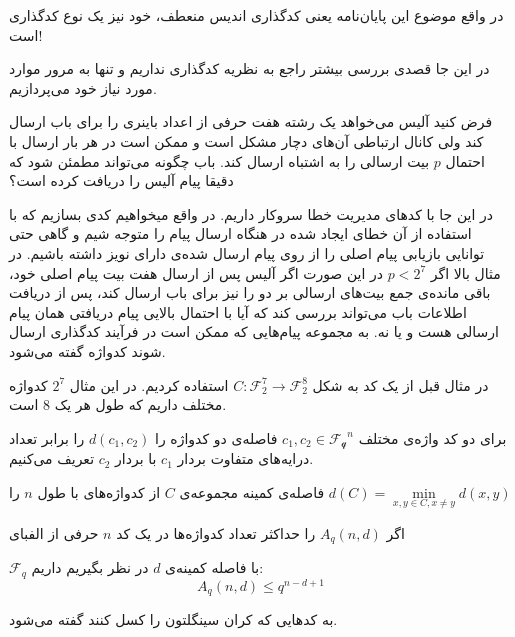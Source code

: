 در واقع موضوع این پایان‌نامه یعنی کدگذاری اندیس منعطف، خود نیز یک نوع کدگذاری است!

در این جا قصدی بررسی بیشتر راجع به نظریه کدگذاری نداریم و تنها به مرور موارد مورد نیاز خود می‌پردازیم.
\begin{example}
	فرض کنید آلیس می‌خواهد یک رشته هفت حرفی از اعداد باینری را برای باب ارسال کند ولی کانال ارتباطی آن‌های دچار مشکل است و ممکن است در هر بار ارسال با احتمال
	$p$
	بیت ارسالی را به اشتباه ارسال کند. باب چگونه می‌تواند مطمئن شود که دقیقا پیام آلیس را دریافت کرده است؟
	
	در این جا با کدهای مدیریت خطا سروکار داریم. در واقع میخواهیم کدی بسازیم که با استفاده از آن خطای ایجاد شده در هنگاه ارسال پیام را متوجه شیم و گاهی حتی توانایی بازیابی پیام اصلی را از روی پیام ارسال شده‌ی دارای نویز داشته باشیم. در مثال بالا اگر
	$p < 2^7$
	در این صورت اگر آلیس پس از ارسال هفت بیت پیام اصلی خود، باقی مانده‌ی جمع بیت‌های ارسالی بر دو را نیز برای باب ارسال کند، پس از دریافت اطلاعات باب می‌تواند بررسی کند که آیا با احتمال بالایی پیام دریافتی همان پیام ارسالی هست و یا نه. به مجموعه‌ پیام‌هایی که ممکن است در فرآیند کدگذاری ارسال شوند کدواژه گفته می‌شود.
	
	در مثال قبل از یک کد به شکل
	$C: \mathcal{F}_2^7 \rightarrow \mathcal{F}_2^8$
	استفاده کردیم. در این مثال
	$2^7$
	کدواژه مختلف داریم که طول هر یک
	$8$
	است.
\end{example}

\begin{definition}
	برای دو کد واژه‌ی مختلف
	$c_1, c_2 \in \mathcal{F_q}^n$
	فاصله‌ی دو کدواژه را
	$d(c_1, c_2)$
	را برابر تعداد درایه‌های متفاوت بردار
	$c_1$
	با بردار
	$c_2$
	تعریف می‌کنیم.
	
	 فاصله‌‌ی کمینه مجموعه‌ی
	$C$
	از کدواژه‌های با طول
	$n$
	 را
	$d(C) = \min\limits_{x, y \in C, x \ne y} d(x, y)$
\end{definition}

\begin{definition}
	اگر
	$A_q(n, d)$
	را حداکثر تعداد کدواژه‌ها در یک کد
	$n$
	حرفی از الفبای
	
	$\mathcal{F}_q$
	با فاصله کمینه‌ی 
	$d$
	در نظر بگیریم داریم:
	\begin{equation}
		A_q(n, d) \leq q^{n - d + 1}
	\end{equation}
	\cite{wiki:Singleton}
\end{definition}
\begin{definition}[
	کد
	\lr{mds}
	]
	\label{def:mds}
	به کدهایی که کران سینگلتون را کسل کنند گفته می‌شود.
\end{definition}

